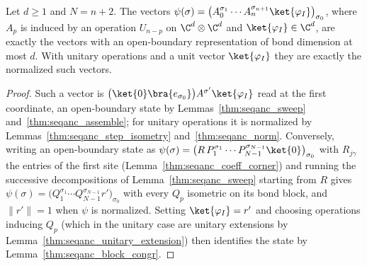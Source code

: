 \begin{lemma}
    \label{thm:seqanc_readout}
    \leanok
    Let $d\ge 1$ and $N=n+2$. The vectors
    $\psi(\sigma)=\bigl(A_0^{\sigma_1}\cdots A_n^{\sigma_{n+1}}
        \ket{\varphi_I}\bigr)_{\sigma_0}$, where $A_p$ is induced by an operation
    $U_{n-p}$ on $\C^d\otimes\C^d$ and $\ket{\varphi_I}\in\C^d$, are exactly
    the vectors with an open-boundary representation of bond dimension at most
    $d$. With unitary operations and a unit vector $\ket{\varphi_I}$ they are
    exactly the normalized such vectors.
\end{lemma}
\begin{proof}
    \leanok
    Such a vector is $\bigl(\ket{0}\bra{e_{\sigma_0}}\bigr)A^{\sigma'}
        \ket{\varphi_I}$ read at the first coordinate, an open-boundary state by
    Lemmas~\ref{thm:seqanc_sweep} and~\ref{thm:seqanc_assemble}; for unitary
    operations it is normalized by Lemmas~\ref{thm:seqanc_step_isometry}
    and~\ref{thm:seqanc_norm}. Conversely, writing an open-boundary state as
    $\psi(\sigma)=\bigl(R\,P_1^{\sigma_1}\cdots P_{N-1}^{\sigma_{N-1}}
        \ket{0}\bigr)_{\sigma_0}$ with $R_{j\gamma}$ the entries of the first
    site (Lemma~\ref{thm:seqanc_coeff_corner}) and running the successive
    decompositions of Lemma~\ref{thm:seqanc_sweep} starting from $R$
    gives $\psi(\sigma)=\bigl(Q_1^{\sigma_1}\cdots Q_{N-1}^{\sigma_{N-1}}
        r'\bigr)_{\sigma_0}$ with every $Q_p$ isometric on its bond block, and
    $\|r'\|=1$ when $\psi$ is normalized. Setting $\ket{\varphi_I}=r'$ and choosing
    operations inducing $Q_p$ (which in the unitary case are unitary
    extensions by Lemma~\ref{thm:seqanc_unitary_extension}) then
    identifies the state by Lemma~\ref{thm:seqanc_block_congr}.
\end{proof}


